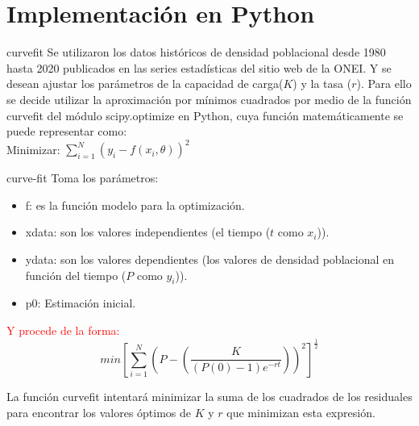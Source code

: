 \documentclass{beamer}
\begin{document}
\section{Implementación en Python}
\begin{frame}{curvefit}
    Se utilizaron los datos históricos de densidad poblacional desde 1980 hasta 2020 publicados en las series estadísticas del sitio web de la ONEI. Y se desean ajustar los parámetros de la capacidad de carga($K$) y la tasa ($r$).
    Para ello se decide utilizar la aproximación por mínimos cuadrados por medio de la función curvefit del módulo scipy.optimize en Python, cuya función matemáticamente se puede representar como:\\
    Minimizar: $\sum_{i=1}^{N} (y_{i} - f(x_{i}, \theta))^2 $ \\
\end{frame}

\begin{frame}{curve-fit}
    Toma los parámetros:
    \begin{itemize}
        \item f: es la función modelo para la optimización.
        \item xdata: son los valores independientes (el tiempo ($t$ como $x_{i}$)).
        \item ydata: son los valores dependientes (los valores de densidad poblacional en función del tiempo ($P$ como $y_{i}$)).
        \item p0: Estimación inicial.
    \end{itemize}
\end{frame}

\begin{frame}
    \begin{block}{\textcolor{red}{Y procede de la forma:}}
    $$min[\sum_{i=1}^{N} (P - (\frac{K}{(P(0)-1)e^{-rt}}))^{2}]^{\frac{1}{2}}$$
    \end{block}
La función curvefit intentará minimizar la suma de los cuadrados de los residuales para encontrar los valores óptimos de $K$ y $r$ que minimizan esta expresión. 
\end{frame}
\end{document}

